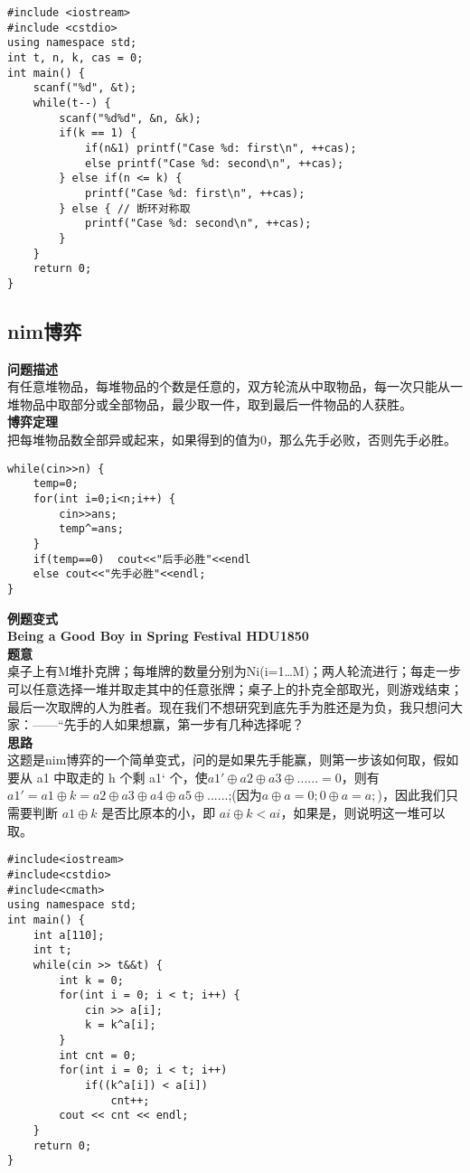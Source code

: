 \begin{lstlisting}
#include <iostream>
#include <cstdio>
using namespace std;
int t, n, k, cas = 0;
int main() {
	scanf("%d", &t);
	while(t--) {
		scanf("%d%d", &n, &k);
		if(k == 1) {
			if(n&1) printf("Case %d: first\n", ++cas);
			else printf("Case %d: second\n", ++cas);
		} else if(n <= k) {
			printf("Case %d: first\n", ++cas);
		} else { // 断环对称取 
			printf("Case %d: second\n", ++cas);
		}
	}
	return 0;
}
\end{lstlisting}

\subsection{nim博弈}
\textbf{问题描述}\\
有任意堆物品，每堆物品的个数是任意的，双方轮流从中取物品，每一次只能从一堆物品中取部分或全部物品，最少取一件，取到最后一件物品的人获胜。\\
\textbf{博弈定理}\\
把每堆物品数全部异或起来，如果得到的值为0，那么先手必败，否则先手必胜。\\
\begin{lstlisting}
while(cin>>n) {
	temp=0;
	for(int i=0;i<n;i++) {
		cin>>ans;
		temp^=ans;
	}
	if(temp==0)  cout<<"后手必胜"<<endl
	else cout<<"先手必胜"<<endl;
}
\end{lstlisting}

\textbf{例题变式}\\
\textbf{Being a Good Boy in Spring Festival HDU1850}\\
\textbf{题意}\\
桌子上有M堆扑克牌；每堆牌的数量分别为Ni(i=1…M)；两人轮流进行；每走一步可以任意选择一堆并取走其中的任意张牌；桌子上的扑克全部取光，则游戏结束；最后一次取牌的人为胜者。现在我们不想研究到底先手为胜还是为负，我只想问大家：——“先手的人如果想赢，第一步有几种选择呢？\\

\textbf{思路}\\
这题是nim博弈的一个简单变式，问的是如果先手能赢，则第一步该如何取，假如要从 a1 中取走的 h 个剩 a1‘ 个，使$ a1' \oplus a2 \oplus a3 \oplus ...... = 0$，则有$a1' = a1 \oplus k = a2 \oplus a3 \oplus a4 \oplus a5 \oplus ......$;(因为$a \oplus a = 0; 0 \oplus a =a;$)，因此我们只需要判断 $a1 \oplus k$ 是否比原本的小，即  $ai \oplus k < ai$，如果是，则说明这一堆可以取。\\

\begin{lstlisting}
#include<iostream>
#include<cstdio>
#include<cmath>
using namespace std;
int main() {
	int a[110];
	int t;
	while(cin >> t&&t) {
		int k = 0;
		for(int i = 0; i < t; i++) {
			cin >> a[i];
			k = k^a[i];
		}
		int cnt = 0;
		for(int i = 0; i < t; i++)
			if((k^a[i]) < a[i])
				cnt++;
		cout << cnt << endl;
	}
	return 0;
}
\end{lstlisting}

